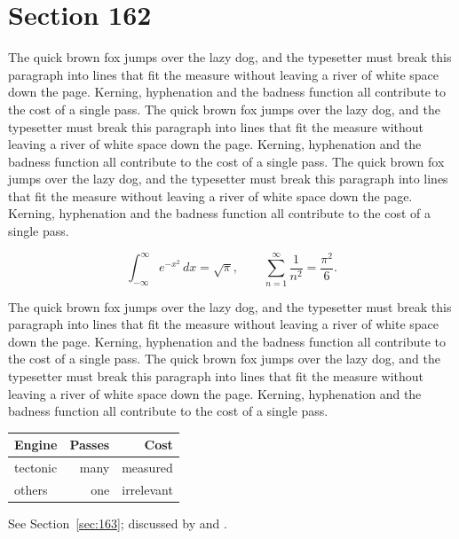 \documentclass{article}
\begin{document}
\section{Section 162}
\label{sec:162}
The quick brown fox jumps over the lazy dog, and the typesetter must break this paragraph into lines that fit the measure without leaving a river of white space down the page. Kerning, hyphenation and the badness function all contribute to the cost of a single pass. The quick brown fox jumps over the lazy dog, and the typesetter must break this paragraph into lines that fit the measure without leaving a river of white space down the page. Kerning, hyphenation and the badness function all contribute to the cost of a single pass. The quick brown fox jumps over the lazy dog, and the typesetter must break this paragraph into lines that fit the measure without leaving a river of white space down the page. Kerning, hyphenation and the badness function all contribute to the cost of a single pass. 

\begin{equation}\label{eq:162}
\int_{-\infty}^{\infty} e^{-x^{2}}\,dx = \sqrt{\pi}, \qquad
\sum_{n=1}^{\infty} \frac{1}{n^{2}} = \frac{\pi^{2}}{6}.
\end{equation}

The quick brown fox jumps over the lazy dog, and the typesetter must break this paragraph into lines that fit the measure without leaving a river of white space down the page. Kerning, hyphenation and the badness function all contribute to the cost of a single pass. The quick brown fox jumps over the lazy dog, and the typesetter must break this paragraph into lines that fit the measure without leaving a river of white space down the page. Kerning, hyphenation and the badness function all contribute to the cost of a single pass. 

\begin{center}
\begin{tabular}{lrr}
\toprule
Engine & Passes & Cost \\
\midrule
tectonic & many & measured \\
others & one & irrelevant \\
\bottomrule
\end{tabular}
\end{center}

See Section~\ref{sec:163}; discussed by \textcite{k3} and \textcite{l5}.
\end{document}
